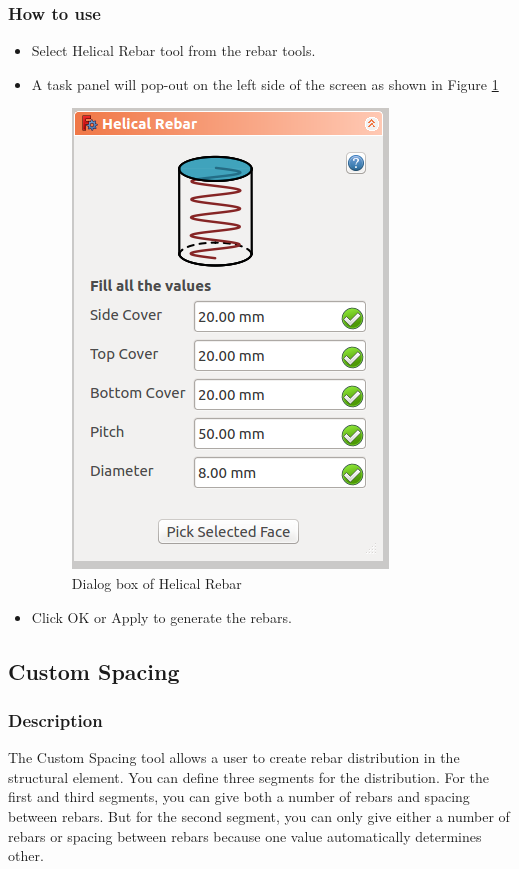\subsubsection{How to use}
\begin{itemize}
\item Select Helical Rebar tool from the rebar tools.
\item A task panel will pop-out on the left side of the screen as shown in Figure \ref{helicalshaperebardialog}
\begin{figure}
    \centering \includegraphics[scale=0.60]{images/HelicalRebarDialog.png}
    \caption{Dialog box of Helical Rebar}
    \label{helicalshaperebardialog}
\end{figure}
\item Click OK or Apply to generate the rebars.
\end{itemize}

\subsection{Custom Spacing}
\subsubsection{Description}
The Custom Spacing tool allows a user to create rebar distribution in the structural element. You can define three segments for the distribution. For the first and third segments, you can give both a number of rebars and spacing between rebars. But for the second segment, you can only give either a number of rebars or spacing between rebars because one value automatically determines other.

